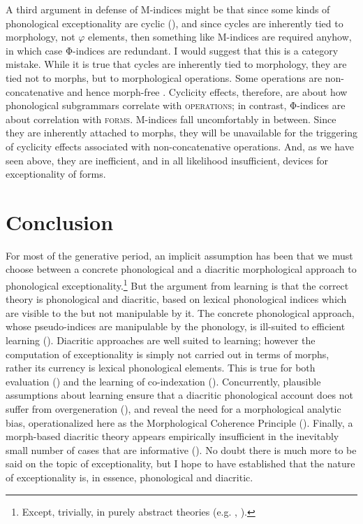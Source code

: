 \documentclass[output=paper,
modfonts
]{LSP/langsci}
\begin{document}
A third argument in defense of M-indices might be that since some kinds of phonological exceptionality are cyclic (), and since cycles are inherently tied to morphology, not $\varphi $ elements, then something like M-indices are required anyhow, in which case Φ-indices are redundant. I would suggest that this is a category mistake. While it is true that cycles are inherently tied to morphology, they are tied not to morphs, but to morphological operations. Some operations are non-concatenative and hence morph-free \citep{anderson1992}. Cyclicity effects, therefore, are about how phonological subgrammars correlate with \textsc{operations}; in contrast, Φ-indices are about correlation with \textsc{forms}. M-indices fall uncomfortably in between. Since they are inherently attached to morphs, they will be unavailable for the triggering of cyclicity effects associated with non-concatenative operations. And, as we have seen above, they are inefficient, and in all likelihood insufficient, devices for exceptionality of forms.

\section[Conclusion]{Conclusion}\label{sec:round:10}

For most of the generative period, an implicit assumption has been that we must choose between a concrete phonological and a diacritic morphological approach to phonological exceptionality.\footnote{Except, trivially, in purely abstract theories (e.g. \citealt{lamb1966}, \citealt{fudge1967}).} But the argument from learning is that the correct theory is phonological and diacritic, based on lexical phonological indices which are visible to the  but not manipulable by it. The concrete phonological approach, whose pseudo-indices are manipulable by the phonology, is ill-suited to efficient learning (). Diacritic approaches are well suited to learning; however the computation of exceptionality is simply not carried out in terms of morphs, rather its currency is lexical phonological elements. This is true for both  evaluation () and the learning of co-indexation (). Concurrently, plausible assumptions about learning ensure that a diacritic phonological account does not suffer from overgeneration (), and reveal the need for a morphological analytic bias, operationalized here as the Morphological Coherence Principle (). Finally, a morph-based diacritic theory appears empirically insufficient in the inevitably small number of cases that are informative (). No doubt there is much more to be said on the topic of exceptionality, but I hope to have established that the nature of exceptionality is, in essence, phonological and diacritic.
\end{document}
